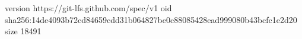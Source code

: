 version https://git-lfs.github.com/spec/v1
oid sha256:14de4093b72cd84659cdd31b064827be0c88085428ead999080b43bcfc1e2d20
size 18491
